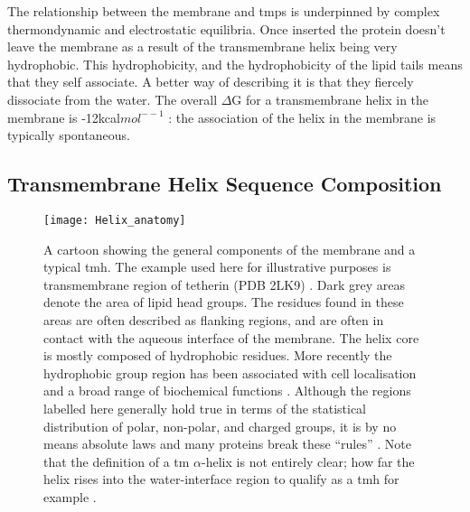 

The relationship between the membrane and \gls{tmp}s is underpinned by complex thermondynamic and electrostatic equilibria. Once inserted the protein doesn't leave the membrane as a result of the transmembrane helix being very hydrophobic. This hydrophobicity, and the hydrophobicity of the lipid tails means that they self associate. A better way of describing it is that they fiercely dissociate from the water. The overall $\Delta$G for a transmembrane helix in the membrane is -12kcal${mol}^{−-1}$ \cite{Cymer2014}: the association of the helix in the membrane is typically spontaneous.

\subsection{Transmembrane Helix Sequence Composition}

\begin{figure}[!ht]
\centering
\texttt{[image: Helix\_anatomy]}
\caption{A cartoon showing the general components of the membrane and a typical \gls{tmh}. The example used here for illustrative purposes is transmembrane region of tetherin (PDB 2LK9) \cite{Skasko2012}. Dark grey areas denote the area of lipid head groups. The residues found in these areas are often described as flanking regions, and are often in contact with the aqueous interface of the membrane. The helix core is mostly composed of hydrophobic residues. More recently the hydrophobic group region has been associated with cell localisation and a broad range of biochemical functions \cite{Junne2010, Wong2012}. Although the regions labelled here generally hold true in terms of the statistical distribution of polar, non-polar, and charged groups, it is by no means absolute laws and many proteins break these ``rules'' \cite{Sharpe2010, Baeza-Delgado2013, Pogozheva2013}. Note that the definition of a \gls{tm} $\alpha$-helix is not entirely clear; how far the helix rises into the water-interface region to qualify as a \gls{tmh} for example \cite{VonHeijne2006}.}
\label{fig:helixcartoon1}
\end{figure}


